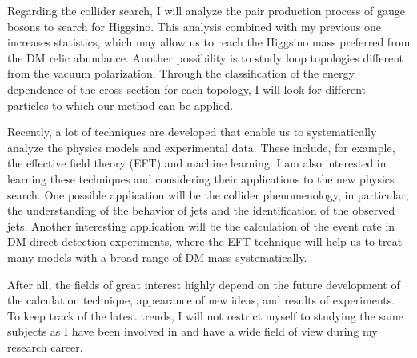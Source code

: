 \documentclass[12pt,notitlepage]{article}
\begin{document}
Regarding the collider search, I will analyze the pair production process of gauge bosons to search for Higgsino.
This analysis combined with my previous one increases statistics, which may allow us to reach the Higgsino mass preferred from the DM relic abundance.
Another possibility is to study loop topologies different from the vacuum polarization.
Through the classification of the energy dependence of the cross section for each topology, I will look for different particles to which our method can be applied.

Recently, a lot of techniques are developed that enable us to systematically analyze the physics models and experimental data.
These include, for example, the effective field theory (EFT) and machine learning.
I am also interested in learning these techniques and considering their applications to the new physics search.
One possible application will be the collider phenomenology, in particular, the understanding of the behavior of jets and the identification of the observed jets.
Another interesting application will be the calculation of the event rate in DM direct detection experiments, where the EFT technique will help us to treat many models with a broad range of DM mass systematically.

After all, the fields of great interest highly depend on the future development of the calculation technique, appearance of new ideas, and results of experiments.
To keep track of the latest trends, I will not restrict myself to studying the same subjects as I have been involved in and have a wide field of view during my research career.
\end{document}

